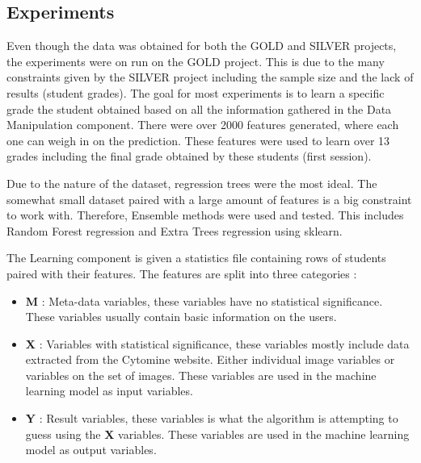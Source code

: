 \documentclass[a4paper,11pt]{report}
\numberwithin{figure}{section} %
\begin{document}
	\subsection{Experiments}
    
    
    Even though the data was obtained for both the GOLD and SILVER projects, the experiments were on run on the GOLD project. This is due to the many constraints given by the SILVER project including the sample size and the lack of results (student grades). The goal for most experiments is to learn a specific grade the student obtained based on all the information gathered in the Data Manipulation component. There were over 2000 features generated, where each one can weigh in on the prediction. These features were used to learn over 13 grades including the final grade obtained by these students (first session).\newline
    
    
    Due to the nature of the dataset, regression trees were the most ideal. The somewhat small dataset paired with a large amount of features is a big constraint to work with. Therefore, Ensemble methods were used and tested. This includes Random Forest regression and Extra Trees regression using sklearn.\newline
    
    The Learning component is given a statistics file containing rows of students paired with their features. The features are split into three categories :
    \begin{itemize}
\item[\textbullet] \textbf{M} : Meta-data variables, these variables have no statistical significance. These variables usually contain basic information on the users.\\
\item[\textbullet] \textbf{X} : Variables with statistical significance, these variables mostly include data extracted from the Cytomine website. Either individual image variables or variables on the set of images. These variables are used in the machine learning model as input variables.\\
\item[\textbullet] \textbf{Y} : Result variables, these variables is what the algorithm is attempting to guess using the  \textbf{X} variables. These variables are used in the machine learning model as output variables.\\ 
\end{itemize}
    
    
    
\end{document}
